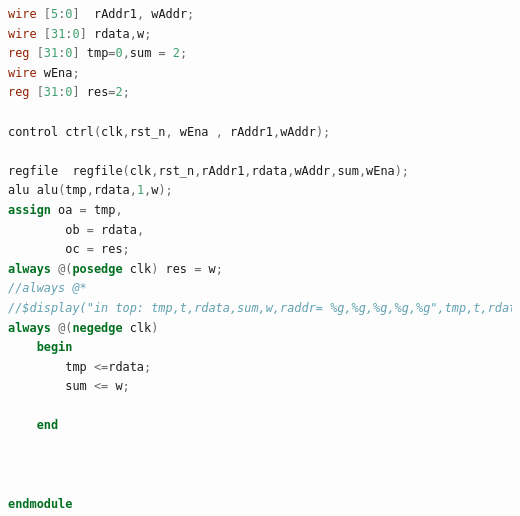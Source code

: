 \documentclass[UTF8]{ctexart}
\begin{document}
\begin{lstlisting}[language=verilog]
wire [5:0]	rAddr1, wAddr;
wire [31:0] rdata,w;
reg [31:0] tmp=0,sum = 2;
wire wEna;
reg [31:0] res=2;

control ctrl(clk,rst_n, wEna , rAddr1,wAddr);

regfile  regfile(clk,rst_n,rAddr1,rdata,wAddr,sum,wEna);
alu alu(tmp,rdata,1,w);
assign oa = tmp,
        ob = rdata,
        oc = res;
always @(posedge clk) res = w;
//always @*
//$display("in top: tmp,t,rdata,sum,w,raddr= %g,%g,%g,%g,%g",tmp,t,rdata,sum,w,rAddr1);
always @(negedge clk)
    begin 
        tmp <=rdata;
        sum <= w;
        
    end



endmodule


\end{lstlisting}
\end{document}
